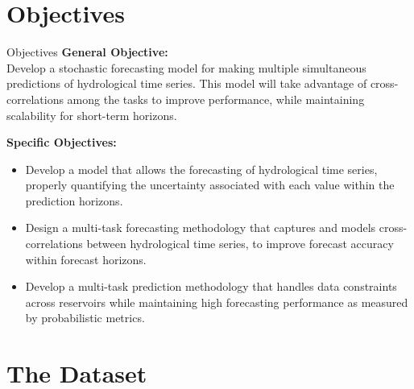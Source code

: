 \section{Objectives}
\begin{frame}{Objectives}
	\textbf{General Objective:} \\
	Develop a stochastic forecasting model for making multiple simultaneous predictions of hydrological time series. This model will take advantage of cross-correlations among the tasks to improve performance, while maintaining scalability for short-term horizons.
	
	\vspace{10pt}
	\textbf{Specific Objectives:}
	\justifying
	\begin{itemize}
		\item Develop a model that allows the forecasting of hydrological time series, properly quantifying the uncertainty associated with each value within the prediction horizons.
		\item  Design a multi-task forecasting methodology that captures and models cross-correlations between hydrological time series, to improve forecast accuracy within forecast horizons.
		\item Develop a multi-task prediction methodology that handles data constraints across reservoirs while maintaining high forecasting performance as measured by probabilistic metrics.
	\end{itemize}
\end{frame}

\section{The Dataset}

